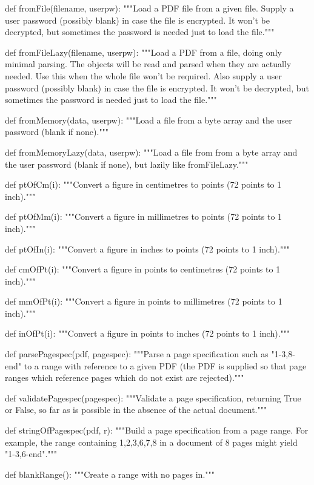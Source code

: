 def fromFile(filename, userpw):
    """Load a PDF file from a given file.  Supply a user password (possibly
    blank) in case the file is encrypted. It won't be decrypted, but sometimes
    the password is needed just to load the file."""

def fromFileLazy(filename, userpw):
    """Load a PDF from a file, doing only minimal parsing. The objects will be
    read and parsed when they are actually needed.  Use this when the whole
    file won't be required. Also supply a user password (possibly blank) in
    case the file is encrypted. It won't be decrypted, but sometimes the
    password is needed just to load the file."""

def fromMemory(data, userpw):
    """Load a file from a byte array and the user password (blank if none)."""

def fromMemoryLazy(data, userpw):
    """Load a file from from a byte array and the user password (blank if
    none), but lazily like fromFileLazy."""

def ptOfCm(i):
    """Convert a figure in centimetres to points (72 points to 1 inch)."""

def ptOfMm(i):
    """Convert a figure in millimetres to points (72 points to 1 inch)."""

def ptOfIn(i):
    """Convert a figure in inches to points (72 points to 1 inch)."""

def cmOfPt(i):
    """Convert a figure in points to centimetres (72 points to 1 inch)."""

def mmOfPt(i):
    """Convert a figure in points to millimetres (72 points to 1 inch)."""

def inOfPt(i):
    """Convert a figure in points to inches (72 points to 1 inch)."""

def parsePagespec(pdf, pagespec):
    """Parse a page specification such as "1-3,8-end" to a range with reference
    to a given PDF (the PDF is supplied so that page ranges which reference
    pages which do not exist are rejected)."""

def validatePagespec(pagespec):
    """Validate a page specification, returning True or False, so far as is
    possible in the absence of the actual document."""

def stringOfPagespec(pdf, r):
    """Build a page specification from a page range. For example, the range
    containing 1,2,3,6,7,8 in a document of 8 pages might yield "1-3,6-end"."""

def blankRange():
    """Create a range with no pages in."""

